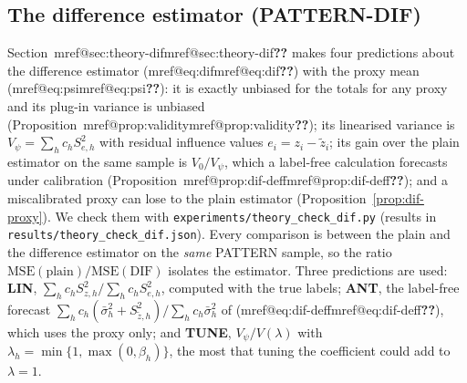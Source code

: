 \documentclass[pdflatex,sn-mathphys-num,iicol]{sn-jnl}
\makeatletter
\theoremstyle{thmstyleone}
\theoremstyle{thmstyletwo}
\theoremstyle{thmstylethree}
\newcommand{\Mref}[1]{\ifcsname mref@#1\endcsname\csname mref@#1\endcsname\else\textbf{??}\fi}
\makeatother
\begin{document}
\subsection{The difference estimator (PATTERN-DIF)}\label{sec:sim-dif}

Section~\Mref{sec:theory-dif} makes four predictions about the difference estimator (\Mref{eq:dif}) with the proxy mean (\Mref{eq:psi}): it is exactly unbiased for the totals
for any proxy and its plug-in variance is unbiased (Proposition~\Mref{prop:validity}); its linearised variance is $V_\psi=\sum_hc_hS^2_{e,h}$ with residual influence values
$e_i=z_i-\tilde z_i$; its gain over the plain estimator on the same sample is $V_0/V_\psi$, which a label-free calculation forecasts under calibration
(Proposition~\Mref{prop:dif-deff}); and a miscalibrated proxy can lose to the plain estimator (Proposition~\ref{prop:dif-proxy}). We check them with
\texttt{experiments/theory\_check\_dif.py} (results in \texttt{results/theory\_check\_dif.json}). Every comparison is between the plain and the
difference estimator on the \emph{same} PATTERN sample, so the ratio $\mathrm{MSE}(\text{plain})/\mathrm{MSE}(\text{DIF})$ isolates the estimator. Three predictions are used:
\textbf{LIN}, $\sum_hc_hS^2_{z,h}/\sum_hc_hS^2_{e,h}$, computed with the true labels; \textbf{ANT}, the label-free forecast
$\sum_hc_h(\bar\sigma^2_h+S^2_{\tilde z,h})/\sum_hc_h\bar\sigma^2_h$ of (\Mref{eq:dif-deff}), which uses the proxy only; and \textbf{TUNE}, $V_\psi/V(\lambda)$ with $\lambda_h=\min\{1,\max(0,\beta_h)\}$, the
most that tuning the coefficient could add to $\lambda=1$.
\end{document}
